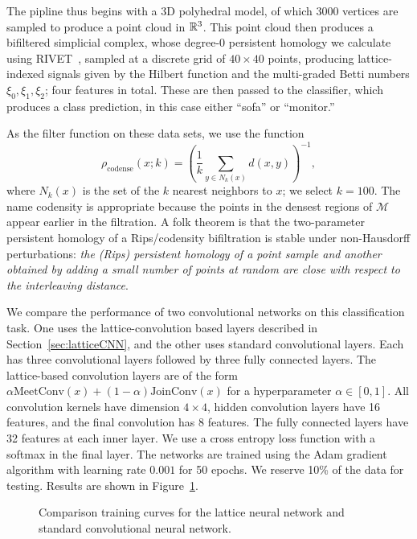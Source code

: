 \documentclass{article}
\begin{document}
The pipline thus begins with a 3D polyhedral model, of which $3000$ vertices are
sampled to produce a point cloud in $\mathbb{R}^3$. This point cloud then produces a
bifiltered simplicial complex, whose degree-$0$ persistent homology we calculate
using RIVET~\cite{lesnick_interactive_2015}, sampled at a discrete grid of $40
\times 40$ points, producing lattice-indexed signals given by the Hilbert
function and the multi-graded Betti numbers $\xi_0, \xi_1, \xi_2$; four features
in total. These are then passed to the classifier, which produces a class
prediction, in this case either ``sofa'' or ``monitor.''

As the filter function on these data sets, we use the  function \[\rho_{\text{codense}}(x;k) = \left( \frac{1}{k} \sum_{y \in N_k(x)} d(x,y) \right)^{-1},\]
where $N_k(x)$ is the set of the $k$ nearest neighbors to $x$; we select
$k=100$. The name codensity is appropriate because the points in the densest
regions of $\mathcal M$ appear earlier in the filtration. A folk theorem is that
the two-parameter persistent homology of a Rips/codensity bifiltration is stable
under non-Hausdorff perturbations: \textit{the (Rips) persistent homology of a
point sample and another obtained by adding a small number of points at random
are close with respect to the interleaving distance}.

We compare the performance of two convolutional networks on this classification
task. One uses the lattice-convolution based layers described in
Section~\ref{sec:latticeCNN}, and the other uses standard convolutional layers.
Each has three convolutional layers followed by three fully connected layers.
The lattice-based convolution layers are of the form $\alpha\text{MeetConv}(x) +
(1-\alpha)\text{JoinConv}(x)$ for a hyperparameter $\alpha \in [0,1]$. All
convolution kernels have dimension $4 \times 4$, hidden convolution layers have
16 features, and the final convolution has 8 features. The fully connected
layers have 32 features at each inner layer. We use a cross entropy loss
function with a softmax in the final layer. The networks are trained using the
Adam gradient algorithm with learning rate $0.001$ for 50 epochs. We reserve
10\% of the data for testing. Results are shown in Figure~\ref{fig:comparison}.

\begin{figure}[h]
  \caption{Comparison training curves for the lattice neural network and
    standard convolutional neural network.}\label{fig:comparison}
    \begin{center}
    \end{center}
\end{figure}
\end{document}
